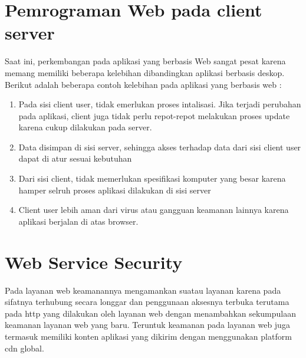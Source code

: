 \section{Pemrograman Web pada client server}
Saat ini, perkembangan pada aplikasi yang berbasis Web sangat pesat karena memang memiliki beberapa kelebihan dibandingkan aplikasi berbasis deskop. Berikut adalah beberapa contoh kelebihan pada aplikasi yang berbasis web :

\begin{enumerate}
    \item Pada sisi client user, tidak emerlukan proses intalisasi. Jika terjadi perubahan pada aplikasi, client juga tidak perlu repot-repot melakukan proses update karena cukup dilakukan  pada server.
    \item Data disimpan di sisi server, sehingga akses terhadap data dari sisi client user dapat di atur sesuai kebutuhan
    \item Dari sisi client, tidak memerlukan spesifikasi komputer yang besar karena hamper selruh proses aplikasi dilakukan di sisi server
    \item Client user lebih aman dari virus atau gangguan keamanan lainnya karena aplikasi berjalan di atas browser.
\end{enumerate}

\section{Web Service Security}
Pada layanan web keamanannya mengamankan suatau layanan karena pada sifatnya terhubung secara longgar dan penggunaan aksesnya terbuka terutama pada http yang
 dilakukan oleh layanan web dengan menambahkan sekumpulaan keamanan layanan web yang baru. Teruntuk keamanan pada layanan web juga termasuk memiliki konten aplikasi yang dikirim dengan menggunakan platform cdn global. 




    
